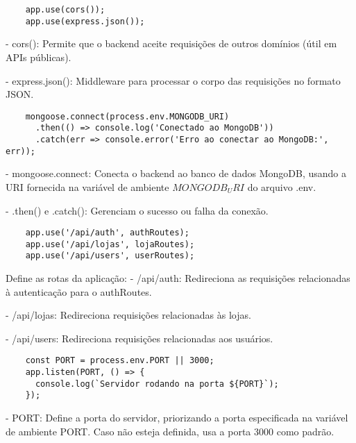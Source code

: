\vspace{1cm}
\begin{lstlisting}
    app.use(cors());
    app.use(express.json());
\end{lstlisting}
\vspace{1cm}

- cors(): Permite que o backend aceite requisições de outros domínios (útil em APIs públicas).

- express.json(): Middleware para processar o corpo das requisições no formato JSON.

\vspace{1cm}
\begin{lstlisting}
    mongoose.connect(process.env.MONGODB_URI)
      .then(() => console.log('Conectado ao MongoDB'))
      .catch(err => console.error('Erro ao conectar ao MongoDB:', err));
\end{lstlisting}
\vspace{1cm}

- mongoose.connect: Conecta o backend ao banco de dados MongoDB, 
usando a URI fornecida na variável de ambiente $MONGODB_URI$ do arquivo .env.

- .then() e .catch(): Gerenciam o sucesso ou falha da conexão.

\vspace{1cm}
\begin{lstlisting}
    app.use('/api/auth', authRoutes);
    app.use('/api/lojas', lojaRoutes);
    app.use('/api/users', userRoutes);
\end{lstlisting}
\vspace{1cm}

Define as rotas da aplicação:
- /api/auth: Redireciona as requisições relacionadas à autenticação para o authRoutes.

- /api/lojas: Redireciona requisições relacionadas às lojas.

- /api/users: Redireciona requisições relacionadas aos usuários.

\vspace{1cm}
\begin{lstlisting}
    const PORT = process.env.PORT || 3000;
    app.listen(PORT, () => {
      console.log(`Servidor rodando na porta ${PORT}`);
    });
\end{lstlisting}
\vspace{1cm}

- PORT: Define a porta do servidor, priorizando a porta especificada na variável de ambiente PORT. 
Caso não esteja definida, usa a porta 3000 como padrão.

